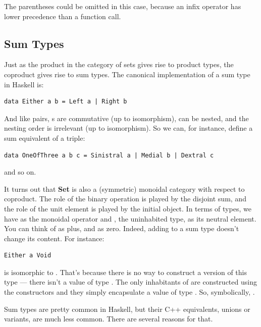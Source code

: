 \noindent
The parentheses could be omitted in this case, because an infix operator
has lower precedence than a function call.

\subsection{Sum Types}\label{sum-types}

Just as the product in the category of sets gives rise to product types,
the coproduct gives rise to sum types. The canonical implementation of a
sum type in Haskell is:

\begin{verbatim}
data Either a b = Left a | Right b
\end{verbatim}

\noindent
And like pairs, s are commutative (up to isomorphism),
can be nested, and the nesting order is irrelevant (up to isomorphism).
So we can, for instance, define a sum equivalent of a triple:

\begin{verbatim}
data OneOfThree a b c = Sinistral a | Medial b | Dextral c
\end{verbatim}

\noindent
and so on.

It turns out that \textbf{Set} is also a (symmetric) monoidal category
with respect to coproduct. The role of the binary operation is played by
the disjoint sum, and the role of the unit element is played by the
initial object. In terms of types, we have  as the
monoidal operator and , the uninhabited type, as its
neutral element. You can think of  as plus, and
 as zero. Indeed, adding  to a sum type
doesn't change its content. For instance:

\begin{verbatim}
Either a Void
\end{verbatim}

\noindent
is isomorphic to . That's because there is no way to construct
a  version of this type --- there isn't a value of type
. The only inhabitants of  are
constructed using the  constructors and they simply
encapsulate a value of type . So, symbolically,
.

Sum types are pretty common in Haskell, but their C++ equivalents,
unions or variants, are much less common. There are several reasons for
that.

